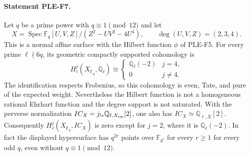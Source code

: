 \documentclass[11pt,a4paper]{article}
\begin{document}
\paragraph{Statement PLE-F7.}
Let $q$ be a prime power with $q\equiv1\pmod{12}$ and let
\[
 X=\operatorname{Spec}
 \mathbb F_q[U,V,Z]/(Z^2-UV^2-4U^4),
 \qquad \deg(U,V,Z)=(2,3,4).
\]
This is a normal affine surface with the Hilbert function $\phi$ of PLE-F5.
For every prime $\ell\nmid6q$, its geometric compactly supported
cohomology is
\[
 H_c^j(X_{\overline{\mathbb F}_q},\mathbb Q_\ell)
 \cong
 \begin{cases}\mathbb Q_\ell(-2)&j=4,\\0&j\ne4.\end{cases}
 \tag{PLE-F7}
\]
The identification respects Frobenius, so this cohomology is even,
Tate, and pure of the expected weight. Nevertheless the Hilbert function
is not a homogeneous rational Ehrhart function and the degree support
is not saturated. With the perverse normalization
$IC_X=j_{!*}\mathbb Q_{\ell,X_{\rm sm}}[2]$, one also has
$IC_X\simeq\mathbb Q_{\ell,X}[2]$. Consequently
$H_c^j(X_{\overline{\mathbb F}_q},IC_X)$ is zero except for
$j=2$, where it is $\mathbb Q_\ell(-2)$.
In fact the displayed hypersurface has
$q^{2r}$ points over $\mathbb F_{q^r}$ for every $r\ge1$ for every odd
$q$, even without $q\equiv1\pmod{12}$.
\end{document}
